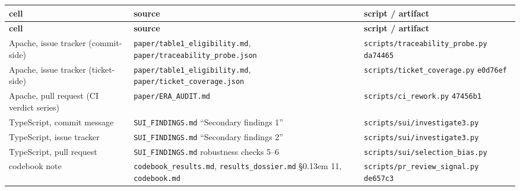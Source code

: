 \documentclass[11pt,a4paper]{article}
\begin{document}
\begin{longtable}{>{\raggedright\arraybackslash}p{}>{\raggedright\arraybackslash}p{}>{\raggedright\arraybackslash}p{}}

\toprule

\textbf{cell} & \textbf{source} & \textbf{script / artifact} \\

\midrule

\endfirsthead

\toprule

\textbf{cell} & \textbf{source} & \textbf{script / artifact} \\

\midrule

\endhead

\bottomrule

\endlastfoot

Apache, issue tracker (commit-\allowbreak{}side) & \texttt{paper/\allowbreak{}table1\_\allowbreak{}eligibility.\allowbreak{}md}, \texttt{paper/\allowbreak{}traceability\_\allowbreak{}probe.\allowbreak{}json} & \texttt{scripts/\allowbreak{}traceability\_\allowbreak{}probe.\allowbreak{}py} \texttt{da74465} \\

Apache, issue tracker (ticket-\allowbreak{}side) & \texttt{paper/\allowbreak{}table1\_\allowbreak{}eligibility.\allowbreak{}md}, \texttt{paper/\allowbreak{}ticket\_\allowbreak{}coverage.\allowbreak{}json} & \texttt{scripts/\allowbreak{}ticket\_\allowbreak{}coverage.\allowbreak{}py} \texttt{e0d76ef} \\

Apache, pull request (CI verdict series) & \texttt{paper/\allowbreak{}ERA\_\allowbreak{}AUDIT.\allowbreak{}md} & \texttt{scripts/\allowbreak{}ci\_\allowbreak{}rework.\allowbreak{}py} \texttt{47456b1} \\

TypeScript, commit message & \texttt{SUI\_\allowbreak{}FINDINGS.\allowbreak{}md} ``Secondary findings 1'' & \texttt{scripts/\allowbreak{}sui/\allowbreak{}investigate3.\allowbreak{}py} \\

TypeScript, issue tracker & \texttt{SUI\_\allowbreak{}FINDINGS.\allowbreak{}md} ``Secondary findings 2'' & \texttt{scripts/\allowbreak{}sui/\allowbreak{}investigate3.\allowbreak{}py} \\

TypeScript, pull request & \texttt{SUI\_\allowbreak{}FINDINGS.\allowbreak{}md} robustness checks 5--6 & \texttt{scripts/\allowbreak{}sui/\allowbreak{}selection\_\allowbreak{}bias.\allowbreak{}py} \\

codebook note & \texttt{codebook\_\allowbreak{}results.\allowbreak{}md}, \texttt{results\_\allowbreak{}dossier.\allowbreak{}md} \S\kern0.13em 11, \texttt{codebook.\allowbreak{}md} & \texttt{scripts/\allowbreak{}pr\_\allowbreak{}review\_\allowbreak{}signal.\allowbreak{}py} \texttt{de657c3} \\

\end{longtable}
\end{document}
